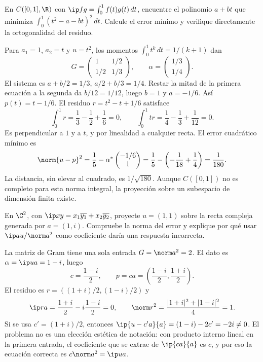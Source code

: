 \begin{ejercicio}\label{ej:ampl-gram-1}
En $C([0,1],\R)$ con $\ip fg=\int_0^1f(t)g(t)\,dt$, encuentre el polinomio $a+bt$ que minimiza $\int_0^1(t^2-a-bt)^2\,dt$. Calcule el error mínimo y verifique directamente la ortogonalidad del residuo.
\end{ejercicio}
\begin{solucion}
Para $a_1=1$, $a_2=t$ y $u=t^2$, los momentos $\int_0^1t^k\,dt=1/(k+1)$ dan
\[
 G=\begin{pmatrix}1&1/2\\1/2&1/3\end{pmatrix},\qquad
 \alpha=\begin{pmatrix}1/3\\1/4\end{pmatrix}.
\]
El sistema es $a+b/2=1/3$, $a/2+b/3=1/4$. Restar la mitad de la primera ecuación a la segunda da $b/12=1/12$, luego $b=1$ y $a=-1/6$. Así $p(t)=t-1/6$. El residuo $r=t^2-t+1/6$ satisface
\[
 \int_0^1r=\frac13-\frac12+\frac16=0,\qquad
 \int_0^1tr=\frac14-\frac13+\frac1{12}=0.
\]
Es perpendicular a $1$ y a $t$, y por linealidad a cualquier recta. El error cuadrático mínimo es
\[
 \norm{u-p}^2=\frac15-\alpha^*\begin{pmatrix}-1/6\\1\end{pmatrix}
 =\frac15-\left(-\frac1{18}+\frac14\right)=\frac1{180}.
\]
La distancia, sin elevar al cuadrado, es $1/\sqrt{180}$. Aunque $C([0,1])$ no es completo para esta norma integral, la proyección sobre un subespacio de dimensión finita existe.
\end{solucion}

\begin{ejercicio}\label{ej:ampl-gram-2}
En $\C^2$, con $\ip xy=x_1\overline{y_1}+x_2\overline{y_2}$, proyecte $u=(1,1)$ sobre la recta compleja generada por $a=(1,i)$. Compruebe la norma del error y explique por qué usar $\ip au/\norm a^2$ como coeficiente daría una respuesta incorrecta.
\end{ejercicio}
\begin{solucion}
La matriz de Gram tiene una sola entrada $G=\norm a^2=2$. El dato es $\alpha=\ip ua=1-i$, luego
\[
 c=\frac{1-i}{2},\qquad p=ca=\left(\frac{1-i}{2},\frac{1+i}{2}\right).
\]
El residuo es $r=((1+i)/2,(1-i)/2)$ y
\[
 \ip ra=\frac{1+i}{2}-i\frac{1-i}{2}=0,\qquad
 \norm r^2=\frac{|1+i|^2+|1-i|^2}{4}=1.
\]
Si se usa $c'=(1+i)/2$, entonces
$\ip{u-c'a}{a}=(1-i)-2c'=-2i\ne0$. El problema no es una elección estética de notación: con producto interno lineal en la primera entrada, el coeficiente que se extrae de $\ip{ca}{a}$ es $c$, y por eso la ecuación correcta es $c\norm a^2=\ip ua$.
\end{solucion}

